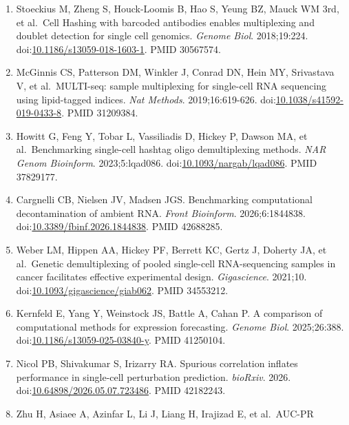 \documentclass[11pt]{article}
\begin{document}
\begin{enumerate}
  pooled single-cell RNA-seq data without genotype reference.
  \emph{Genome Biol}. 2019;20:273.
  doi:\href{https://doi.org/10.1186/s13059-019-1865-2}{10.1186/s13059-019-1865-2}.
  PMID 31836005.
\item
  Stoeckius M, Zheng S, Houck-Loomis B, Hao S, Yeung BZ, Mauck WM 3rd,
  et al.~Cell Hashing with barcoded antibodies enables multiplexing and
  doublet detection for single cell genomics. \emph{Genome Biol}.
  2018;19:224.
  doi:\href{https://doi.org/10.1186/s13059-018-1603-1}{10.1186/s13059-018-1603-1}.
  PMID 30567574.
\item
  McGinnis CS, Patterson DM, Winkler J, Conrad DN, Hein MY, Srivastava
  V, et al.~MULTI-seq: sample multiplexing for single-cell RNA
  sequencing using lipid-tagged indices. \emph{Nat Methods}.
  2019;16:619-626.
  doi:\href{https://doi.org/10.1038/s41592-019-0433-8}{10.1038/s41592-019-0433-8}.
  PMID 31209384.
\item
  Howitt G, Feng Y, Tobar L, Vassiliadis D, Hickey P, Dawson MA, et
  al.~Benchmarking single-cell hashtag oligo demultiplexing methods.
  \emph{NAR Genom Bioinform}. 2023;5:lqad086.
  doi:\href{https://doi.org/10.1093/nargab/lqad086}{10.1093/nargab/lqad086}.
  PMID 37829177.
\item
  Cargnelli CB, Nielsen JV, Madsen JGS. Benchmarking computational
  decontamination of ambient RNA. \emph{Front Bioinform}.
  2026;6:1844838.
  doi:\href{https://doi.org/10.3389/fbinf.2026.1844838}{10.3389/fbinf.2026.1844838}.
  PMID 42688285.
\item
  Weber LM, Hippen AA, Hickey PF, Berrett KC, Gertz J, Doherty JA, et
  al.~Genetic demultiplexing of pooled single-cell RNA-sequencing
  samples in cancer facilitates effective experimental design.
  \emph{Gigascience}. 2021;10.
  doi:\href{https://doi.org/10.1093/gigascience/giab062}{10.1093/gigascience/giab062}.
  PMID 34553212.
\item
  Kernfeld E, Yang Y, Weinstock JS, Battle A, Cahan P. A comparison of
  computational methods for expression forecasting. \emph{Genome Biol}.
  2025;26:388.
  doi:\href{https://doi.org/10.1186/s13059-025-03840-y}{10.1186/s13059-025-03840-y}.
  PMID 41250104.
\item
  Nicol PB, Shivakumar S, Irizarry RA. Spurious correlation inflates
  performance in single-cell perturbation prediction. \emph{bioRxiv}.
  2026.
  doi:\href{https://doi.org/10.64898/2026.05.07.723486}{10.64898/2026.05.07.723486}.
  PMID 42182243.
\item
  Zhu H, Asiaee A, Azinfar L, Li J, Liang H, Irajizad E, et al.~AUC-PR

\end{enumerate}
\end{document}
